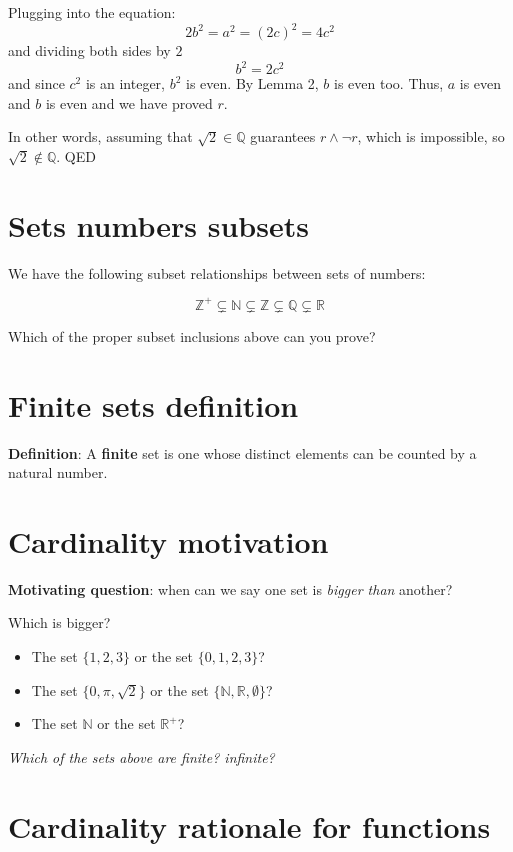 \documentclass[12pt, oneside]{article}
\begin{document}
Plugging into the equation:
\[
    2b^2 = a^2 = (2c)^2 = 4c^2
\]
and dividing both sides by $2$
\[
    b^2 = 2c^2
\]
and since $c^2$ is an integer, $b^2$ is even. By Lemma 2, $b$ is even too.
Thus, $a$ is even and $b$ is even and we have proved $r$. 

In other words, assuming that $\sqrt{2} \in \mathbb{Q}$ guarantees $r \land \lnot r$, 
which is impossible, so $\sqrt{2} \notin \mathbb{Q}$. QED

 \vfill
\section*{Sets numbers subsets}


We have the following subset relationships between sets of numbers:

\[
    \mathbb{Z}^{+} \subsetneq \mathbb{N} \subsetneq \mathbb{Z} \subsetneq \mathbb{Q} \subsetneq \mathbb{R}
\]


Which of the proper subset inclusions above can you prove?

\vspace{50pt} \vfill
\section*{Finite sets definition}


{\bf Definition}: A {\bf finite} set is one whose distinct elements can be counted by a natural number.
 \vfill
\section*{Cardinality motivation}


{\bf Motivating question}: when can we say one set is {\it bigger than} another?

Which is bigger? 
\begin{itemize}
    \item The set $\{1,2,3\}$ or the set $\{0,1,2,3\}$?
    \item The set $\{0, \pi, \sqrt{2} \}$ or the set $\{\mathbb{N}, \mathbb{R}, \emptyset\}$?
    \item The set $\mathbb{N}$ or the set $\mathbb{R}^+$?
\end{itemize}

{\it Which of the sets above are finite? infinite?} \vfill
\section*{Cardinality rationale for functions}
\end{document}
